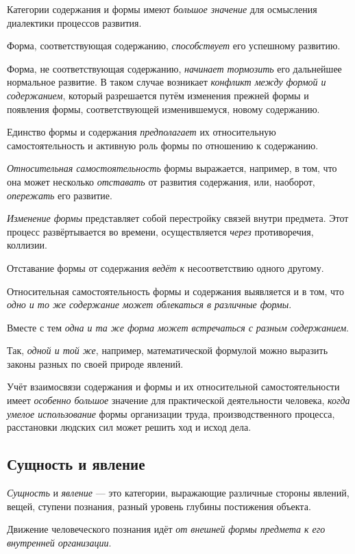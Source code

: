 \documentclass[a4paper,14pt,russian]{extreport}
\begin{document}
Категории содержания и формы имеют \emph{большое значение} для осмысления диалектики процессов развития.

Форма, соответствующая содержанию, \emph{способствует} его успешному развитию.

Форма, не соответствующая содержанию, \emph{начинает тормозить} его дальнейшее нормальное развитие. В таком случае возникает \emph{конфликт между формой и содержанием}, который разрешается путём изменения прежней формы и появления формы, соответствующей изменившемуся, новому содержанию.

Единство формы и содержания \emph{предполагает} их относительную самостоятельность и активную роль формы по отношению к содержанию.

\emph{Относительная самостоятельность} формы выражается, например, в том, что она может несколько \emph{отставать} от развития содержания, или, наоборот, \emph{опережать} его развитие.

\emph{Изменение формы} представляет собой перестройку связей внутри предмета. Этот процесс развёртывается во времени, осуществляется \emph{через} противоречия, коллизии.

Отставание формы от содержания \emph{ведёт к} несоответствию одного другому.

Относительная самостоятельность формы и содержания выявляется и в том, что \emph{одно и то же содержание может облекаться в различные формы}.

Вместе с тем \emph{одна и та же форма может встречаться с разным содержанием}.

Так, \emph{одной и той же}, например, математической формулой можно выразить законы разных по своей природе явлений.

Учёт взаимосвязи содержания и формы и их относительной самостоятельности имеет \emph{особенно большое} значение для практической деятельности человека, \emph{когда умелое использование} формы организации труда, производственного процесса, расстановки людских сил может решить ход и исход дела.

\subsection{Сущность и явление}

\emph{Сущность} и \emph{явление} --- это категории, выражающие различные стороны явлений, вещей, ступени познания, разный уровень глубины постижения объекта.

Движение человеческого познания идёт \emph{от внешней формы предмета к его внутренней организации}.
\end{document}
